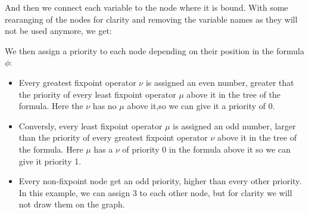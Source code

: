 And then we connect each variable to the node where it is bound.
With some rearanging of the nodes for clarity and removing the variable names
as they will not be used anymore, we get:

\begin{center}
\end{center}

We then assign a priority to each node depending on their position in the formula $\phi$:
\begin{itemize}
    \item Every greatest fixpoint operator $\nu$ is assigned an even number,
        greater that the priority of every least fixpoint operator $\mu$
        above it in the tree of the formula.
        Here the $\nu$ has no $\mu$ above it,so we can give it
        a priority of $0$.
    \item Conversly, every least fixpoint operator $\mu$ is assigned an odd number,
        larger than the priority of every greatest fixpoint operator $\nu$
        above it in the tree of the formula.
        Here $\mu$ has a $\nu$ of priority 0 in the formula above it
        so we can give it priority 1.
    \item Every non-fixpoint node get an odd priority, higher than every other priority.
        In this example, we can assign $3$ to each other node, but for clarity
        we will not draw them on the graph.
\end{itemize}

\begin{center}
\end{center}

